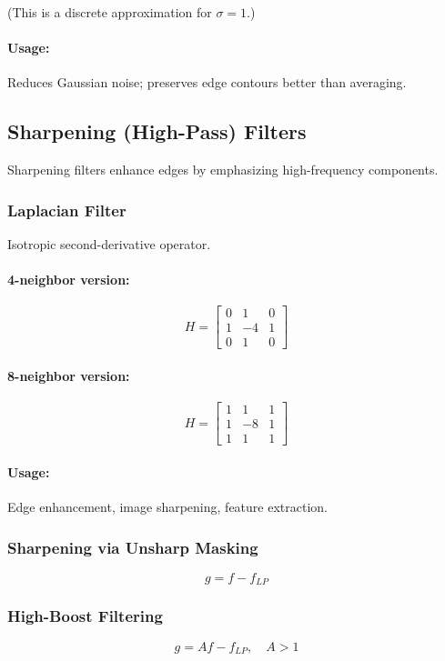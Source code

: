 \documentclass{AnantDocumentation}
\begin{document}
(This is a discrete approximation for $\sigma=1$.)

\paragraph{Usage:}
Reduces Gaussian noise; preserves edge contours better than averaging.

\subsection{Sharpening (High-Pass) Filters}

Sharpening filters enhance edges by emphasizing high-frequency components.

\subsubsection{Laplacian Filter}
Isotropic second-derivative operator.

\paragraph{4-neighbor version:}
\[
H =
\begin{bmatrix}
0 & 1 & 0\\
1 & -4 & 1\\
0 & 1 & 0
\end{bmatrix}
\]

\paragraph{8-neighbor version:}
\[
H =
\begin{bmatrix}
1 & 1 & 1\\
1 & -8 & 1\\
1 & 1 & 1
\end{bmatrix}
\]

\paragraph{Usage:}
Edge enhancement, image sharpening, feature extraction.

\subsubsection{Sharpening via Unsharp Masking}
\[
g = f - f_{LP}
\]

\subsubsection{High-Boost Filtering}
\[
g = A f - f_{LP}, \quad A > 1
\]
\end{document}
